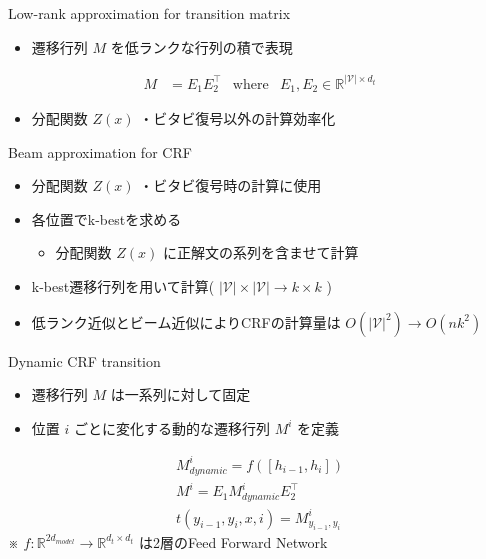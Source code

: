 \documentclass[unicode, 12pt, aspectratio=43]{beamer}
\begin{document}
\begin{frame}[label={sec:org5835aa8}]{\large Low-rank approximation for transition matrix}
\begin{itemize}
\item 遷移行列 \(M\) を低ランクな行列の積で表現
\end{itemize}

\begin{align*}
    M &= E_1 E_2^\top & \mathrm{where} & E_1, E_2 \in \mathbb{R}^{|\mathcal{V}|\times d_t}
\end{align*}
\begin{itemize}
\item 分配関数 \(Z(x)\) ・ビタビ復号以外の計算効率化
\end{itemize}
\end{frame}

\begin{frame}[label={sec:org4efdd26}]{Beam approximation for CRF}
\begin{itemize}
\item 分配関数 \(Z(x)\) ・ビタビ復号時の計算に使用
\item 各位置でk-bestを求める
\begin{itemize}
\item 分配関数 \(Z(x)\) に正解文の系列を含ませて計算
\end{itemize}
\item k-best遷移行列を用いて計算( \(|\mathcal{V}|\times|\mathcal{V}| \rightarrow k \times k\) )

\item 低ランク近似とビーム近似によりCRFの計算量は \(O(|\mathcal{V}|^2) \rightarrow O(nk^2)\)
\end{itemize}
\end{frame}

\begin{frame}[label={sec:org7c3a053}]{Dynamic CRF transition}
\begin{itemize}
\item 遷移行列 \(M\) は一系列に対して固定
\item 位置 \(i\) ごとに変化する動的な遷移行列 \(M^i\) を定義
\end{itemize}
\begin{align*}
    M_{dynamic}^{i} = f([h_{i-1}, h_i]) \\
    M^i = E_1 M_{dynamic}^i E_2^\top \\
    t(y_{i-1}, y_i, x, i) = M_{y_{i-1}, y_i}^i
\end{align*}
※ \(f: \mathbb{R}^{2d_{model}} \rightarrow \mathbb{R}^{d_t \times d_t}\) は2層のFeed Forward Network
\end{frame}
\end{document}
